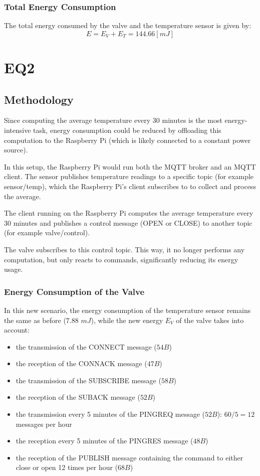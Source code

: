 \documentclass{Configuration_Files/PoliMi3i_thesis}
\begin{document}
\subsection{Total Energy Consumption}
The total energy consumed by the valve and the temperature sensor is given by:
\begin{equation}
    E = E_V + E_T = 144.66 [mJ]
\end{equation}

\chapter{EQ2}
\section{Methodology}
Since computing the average temperature every 30 minutes is the most energy-intensive task, energy consumption could be reduced by offloading this computation to the Raspberry Pi (which is likely connected to a constant power source).

In this setup, the Raspberry Pi would run both the MQTT broker and an MQTT client. The sensor publishes temperature readings to a specific topic (for example sensor/temp), which the Raspberry Pi’s client subscribes to to collect and process the average.

The client running on the Raspberry Pi computes the average temperature every 30 minutes and publishes a control message (OPEN or CLOSE) to another topic (for example valve/control). 

The valve subscribes to this control topic. This way, it no longer performs any computation, but only reacts to commands, significantly reducing its energy usage.

\newpage
\subsection{Energy Consumption of the Valve}
In this new scenario, the energy consumption of the temperature sensor remains the same as before ($7.88$ $mJ$), while the new energy $E_V$ of the valve takes into account:

\begin{itemize}
    \item the transmission of the CONNECT message ($54B$)
    \item the reception of the CONNACK message ($47B$)
    \item the transmission of the SUBSCRIBE message ($58B$)
    \item the reception of the SUBACK message ($52B$)
    \item the transmission every 5 minutes of the PINGREQ message ($52B$): $60/5=12$ messages per hour
    \item the reception every 5 minutes of the PINGRES message ($48B$)
    \item the reception of the PUBLISH message containing the command to either close or open 12 times per hour ($68B$)
\end{itemize}
\end{document}
